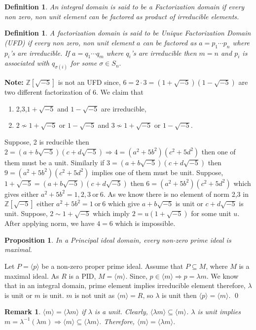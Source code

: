 \documentclass[11pt]{amsart}
\newtheorem{definition}[theorem]{Definition}%
\newtheorem{proposition}[theorem]{Proposition}%
\newtheorem*{remark*}{Remark}
\newcommand{\ZZ}{\mathbb Z}
\newcommand{\gen}[1]{\langle#1\rangle}
\begin{document}
\begin{definition}
An integral domain is said to be a Factorization domain if every non zero, non unit element can be factored as product of irreducible elements.
\end{definition}
\begin{definition}
A factorization domain is said to be Unique Factorization Domain (UFD) if every non zero, non unit element $a$ can be factored as $a=p_1\cdots p_n$ where $p_i$'s are irreducible. If $a=q_1\cdots q_m$ where $q_i$'s are irreducible then $m=n$ and $p_i$ is associated with $q_{\sigma (i)}$ for some $\sigma\in S_n.$
\end{definition}
\textbf{Note:} ${\ZZ}[\sqrt{-5}]$ is not an UFD since, $6=2\cdot 3=(1+\sqrt{-5})(1-\sqrt{-5})$ are two different factorization of $6$. We claim that \begin{enumerate}
\item 2,3,$1+\sqrt{-5}$ and $1-\sqrt{-5}$ are irreducible,
\item $2\nsim 1+\sqrt{-5}$ or $1-\sqrt{-5}$ and $3\nsim 1+\sqrt{-5}$ or $1-\sqrt{-5}$. 
\end{enumerate}
Suppose, 2 is reducible then $2=(a+b\sqrt{-5})(c+d\sqrt{-5})\Rightarrow 4=(a^2+5b^2)(c^2+5d^2)$ then one of them must be a unit. Similarly if $3=(a+b\sqrt{-5})(c+d\sqrt{-5})$ then $9=(a^2+5b^2)(c^2+5d^2)$ implies one of them must be unit. Suppose, $1+\sqrt{-5}=(a+b\sqrt{-5})(c+d\sqrt{-5})$ then $6=(a^2+5b^2)(c^2+5d^2)$ which gives either $a^2+5b^2=1,2,3~\text{or}~6$. As we know there is no element of norm 2,3 in ${\ZZ}[\sqrt{-5}]$ either $a^2+5b^2=1~\text{or}~6$ which give $a+b\sqrt{-5}$ is unit or $c+d\sqrt{-5}$ is unit. Suppose, $2\sim 1+\sqrt{-5}$ which imply $2=u(1+\sqrt{-5})$ for some unit $u$. After applying norm, we have $4=6$ which is impossible.

\begin{proposition}
In a Principal ideal domain, every non-zero prime ideal is maximal.
\end{proposition}
\proof Let $P=\gen{p}$ be a non-zero proper prime ideal. Assume that $P\subseteq M$, where $M$ is a maximal ideal. As $R$ is a PID, $M=\gen{m}.$ Since, $p\in \gen{m} \Rightarrow p=\lambda m.$ We know that in an integral domain, prime element implies irreducible element therefore, $\lambda$ is unit or $m$ is unit. $m$ is not unit as $\gen{m}=R$, so $\lambda$ is unit then $\gen{p}=\gen{m}.$ \qed
\begin{remark*}
$\gen{m}=\gen{\lambda m}$ if $\lambda$ is a unit. Clearly, $\gen{\lambda m}\subseteq \gen{m}$. $\lambda$ is unit implies $m=\lambda^{-1}(\lambda m) \Rightarrow \gen{m}\subseteq \gen{\lambda m}.$ Therefore, $\gen{m}=\gen{\lambda m}.$
\end{remark*}
\end{document}
